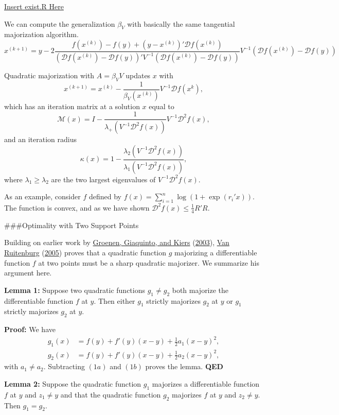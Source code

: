\documentclass[
  12pt,
]{book}
\begin{document}
\href{../code/exist.R}{Insert exist.R Here}

We can compute the generalization \(\beta_V\) with basically the same tangential majorization algorithm.
\[
x^{(k+1)}=y-2\frac{f(x^{(k)})-f(y)+(y-x^{(k)})'\mathcal{D}f(x^{(k)})}{(\mathcal{D}f(x^{(k)})-\mathcal{D}f(y))'V^{-1}(\mathcal{D}f(x^{(k)})-\mathcal{D}f(y))}V^{-1}(\mathcal{D}f(x^{(k)})-\mathcal{D}f(y))
\]

Quadratic majorization with \(A=\beta_V V\) updates \(x\) with
\[
x^{(k+1)}=x^{(k)}-\frac{1}{\beta_V(x^{(k)})}V^{-1}\mathcal{D}f(x^{k}),
\]
which has an iteration matrix at a solution \(x\) equal to
\[
\mathcal{M}(x)=I-\frac{1}{\lambda_+(V^{-1}\mathcal{D}^2f(x))}V^{-1}\mathcal{D}^2f(x),
\]
and an iteration radius
\[
\kappa(x)=1-\frac{\lambda_2(V^{-1}\mathcal{D}^2f(x))}{\lambda_1(V^{-1}\mathcal{D}^2f(x))},
\]
where \(\lambda_1\geq\lambda_2\) are the two largest eigenvalues of \(V^{-1}\mathcal{D}^2f(x).\)

As an example, consider \(f\) defined by \(f(x)=\sum_{i=1}^n\log(1+\exp(r_i'x)).\)
The function is convex, and as we have shown \(\mathcal{D}^2f(x)\leq\frac14 R'R.\)

\#\#\#Optimality with Two Support Points

Building on earlier work by \protect\hyperlink{ref-groenen_giaquinto_kiers_03}{Groenen, Giaquinto, and Kiers} (\protect\hyperlink{ref-groenen_giaquinto_kiers_03}{2003}), \protect\hyperlink{ref-vanruitenburg_05}{Van Ruitenburg} (\protect\hyperlink{ref-vanruitenburg_05}{2005}) proves that a quadratic function \(g\) majorizing a differentiable function \(f\) at two points must be a sharp quadratic majorizer. We summarize his argument here.

\textbf{Lemma 1:}
Suppose two quadratic functions \(g_1\not= g_2\) both majorize the differentiable function \(f\) at \(y\). Then either \(g_1\) strictly majorizes \(g_2\) at \(y\) or \(g_1\) strictly majorizes \(g_2\) at \(y\).

\textbf{Proof:}
We have
\begin{align*}
g_1(x)&=f(y)+f'(y)(x-y)+\frac12 a_1(x-y)^2,\tag{1a}\\
g_2(x)&=f(y)+f'(y)(x-y)+\frac12 a_2(x-y)^2,\tag{1b}
\end{align*}
with \(a_1\not= a_2\). Subtracting \((1a)\) and \((1b)\) proves the lemma.
\textbf{QED}

\textbf{Lemma 2:}
Suppose the quadratic function \(g_1\) majorizes a differentiable function \(f\) at \(y\) and \(z_1\not= y\) and that the quadratic function \(g_2\) majorizes \(f\) at \(y\) and \(z_2\not= y\). Then \(g_1=g_2\).
\end{document}
